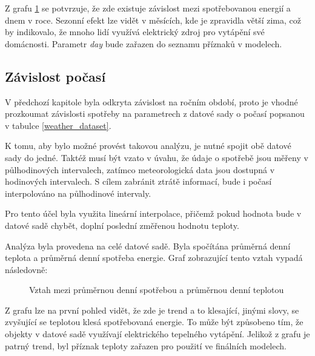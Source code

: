 \documentclass[FM,BP,fonts]{tulthesis}
\begin{document}
Z grafu \ref{fig:year_avg_all} se potvrzuje, že zde existuje závislost mezi spotřebovanou energií a dnem v roce. Sezonní efekt lze vidět v měsících, kde je zpravidla větší zima, což by indikovalo, že mnoho lidí využívá elektrický zdroj pro vytápění své domácnosti. Parametr \textit{day} bude zařazen do seznamu příznaků v modelech.

\subsection{Závislost počasí}
V předchozí kapitole byla odkryta závislost na ročním období, proto je vhodné prozkoumat závislosti spotřeby na parametrech z datové sady o počasí popsanou v tabulce \ref{weather_dataset}.

K tomu, aby bylo možné provést takovou analýzu, je nutné spojit obě datové sady do jedné. Taktéž musí být vzato v úvahu, že údaje o spotřebě jsou měřeny v půlhodinových intervalech, zatímco meteorologická data jsou dostupná v hodinových intervalech. S cílem zabránit ztrátě informací, bude i počasí interpolováno na půlhodinové intervaly.

Pro tento účel byla využita lineární interpolace, přičemž pokud hodnota bude v datové sadě chybět, doplní poslední změřenou hodnotu teploty.

Analýza byla provedena na celé datové sadě. Byla spočítána průměrná denní teplota a průměrná denní spotřeba energie. Graf zobrazující tento vztah vypadá následovně:

\begin{figure}[htbp]
	\centering
	\caption{Vztah mezi průměrnou denní spotřebou a průměrnou denní teplotou}
	\label{fig:year_avg_all}
\end{figure}

Z grafu lze na první pohled vidět, že zde je trend a to klesající, jinými slovy, se zvyšující se teplotou klesá spotřebovaná energie. To může být způsobeno tím, že objekty v datové sadě využívají elektrického tepelného vytápění. Jelikož z grafu je patrný trend, byl příznak teploty zařazen pro použití ve finálních modelech.
\end{document}
